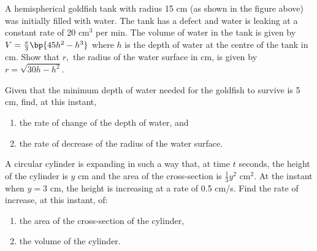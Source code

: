 \begin{problem}
    A hemispherical goldfish tank with radius 15 cm (as shown in the figure above) was initially filled with water. The tank has a defect and water is leaking at a constant rate of 20 cm$^3$ per min. The volume of water in the tank is given by $V = \frac\pi3 \bp{45 h^2 - h^3}$ where $h$ is the depth of water at the centre of the tank in cm. Show that $r,$ the radius of the water surface in cm, is given by $r=\sqrt{30h-h^{2}}$.

    \begin{center}
    \end{center}

    Given that the minimum depth of water needed for the goldfish to survive is 5 cm, find, at this instant,
    \begin{enumerate}
        \item the rate of change of the depth of water, and
        \item the rate of decrease of the radius of the water surface.
    \end{enumerate}
\end{problem}

\begin{problem}
    A circular cylinder is expanding in such a way that, at time $t$ seconds, the height of the cylinder is $y$ cm and the area of the cross-section is $\frac13 y^2$ cm$^2$. At the instant when $y=3$ cm, the height is increasing at a rate of 0.5 cm/s. Find the rate of increase, at this instant, of:
    \begin{enumerate}
        \item the area of the cross-section of the cylinder,
        \item the volume of the cylinder.
    \end{enumerate}
\end{problem}

